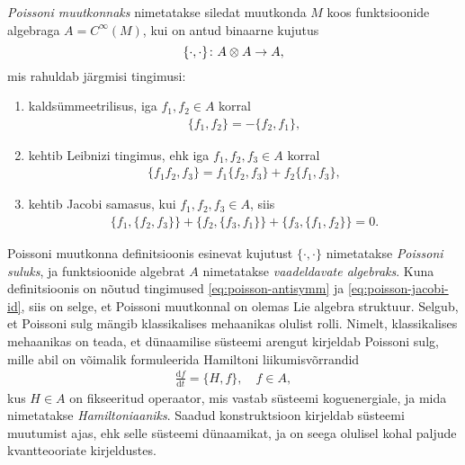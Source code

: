 \begin{dfn}
    \emph{Poissoni muutkonnaks} nimetatakse siledat muutkonda $M$ koos
    funktsioonide algebraga $A = C^\infty(M)$, kui on antud binaarne
    kujutus
    \[ \{\cdot, \cdot\} \colon A \otimes A \to A, \]
    mis rahuldab järgmisi tingimusi:
    \begin{enumerate}
      \item kaldsümmeetrilisus, iga $f_1, f_2 \in A$ korral
          \begin{align}\label{eq:poisson-antisymm}
              \{f_1, f_2\} = -\{f_2, f_1\},
          \end{align}
      \item kehtib Leibnizi tingimus, ehk iga $f_1, f_2, f_3 \in A$ korral
          \begin{align}
              \{f_1 f_2, f_3\} = f_1 \{f_2, f_3\} + f_2 \{f_1, f_3\},
          \end{align}
      \item kehtib Jacobi samasus, kui $f_1, f_2, f_3 \in A$, siis
          \begin{align}\label{eq:poisson-jacobi-id}
              \{f_1, \{f_2, f_3\}\} + \{f_2, \{f_3, f_1\}\} +
              \{f_3, \{f_1, f_2\}\} = 0.
          \end{align}
    \end{enumerate}
\end{dfn}

Poissoni muutkonna definitsioonis esinevat kujutust $\{\cdot, \cdot\}$
nimetatakse \emph{Poissoni suluks}, ja funktsioonide algebrat $A$ nimetatakse
\emph{vaadeldavate algebraks}. Kuna definitsioonis on nõutud tingimused
\eqref{eq:poisson-antisymm} ja \eqref{eq:poisson-jacobi-id}, siis on selge,
et Poissoni muutkonnal on olemas Lie algebra struktuur.
Selgub, et Poissoni sulg mängib klassikalises mehaanikas olulist rolli.
Nimelt, klassikalises mehaanikas on teada, et dünaamilise süsteemi arengut
kirjeldab Poissoni sulg, mille abil on võimalik formuleerida Hamiltoni
liikumisvõrrandid
\begin{align}\label{eq:hamilton-equation}
    \frac{\mathrm{d} f}{\mathrm{d} t} = \{H, f\}, \quad f \in A,
\end{align}
kus $H \in A$ on fikseeritud operaator, mis vastab süsteemi koguenergiale,
ja mida nimetatakse \emph{Hamiltoniaaniks}. Saadud konstruktsioon
kirjeldab süsteemi muutumist ajas, ehk selle süsteemi dünaamikat, ja on
seega olulisel kohal paljude kvantteooriate kirjeldustes.

